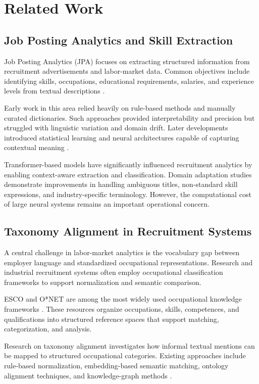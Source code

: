 \section{Related Work}

\subsection{Job Posting Analytics and Skill Extraction}

Job Posting Analytics (JPA) focuses on extracting structured information from recruitment advertisements and labor-market data. Common objectives include identifying skills, occupations, educational requirements, salaries, and experience levels from textual descriptions \cite{senger2024deep}.

Early work in this area relied heavily on rule-based methods and manually curated dictionaries. Such approaches provided interpretability and precision but struggled with linguistic variation and domain drift. Later developments introduced statistical learning and neural architectures capable of capturing contextual meaning \cite{devlin2019bert}.

Transformer-based models have significantly influenced recruitment analytics by enabling context-aware extraction and classification. Domain adaptation studies demonstrate improvements in handling ambiguous titles, non-standard skill expressions, and industry-specific terminology. However, the computational cost of large neural systems remains an important operational concern.

\subsection{Taxonomy Alignment in Recruitment Systems}

A central challenge in labor-market analytics is the vocabulary gap between employer language and standardized occupational representations. Research and industrial recruitment systems often employ occupational classification frameworks to support normalization and semantic comparison.

ESCO and O*NET are among the most widely used occupational knowledge frameworks \cite{esco2024, peterson2001occupational}. These resources organize occupations, skills, competences, and qualifications into structured reference spaces that support matching, categorization, and analysis.

Research on taxonomy alignment investigates how informal textual mentions can be mapped to structured occupational categories. Existing approaches include rule-based normalization, embedding-based semantic matching, ontology alignment techniques, and knowledge-graph methods \cite{staab2009handbook, shvaiko2013ontology}.

